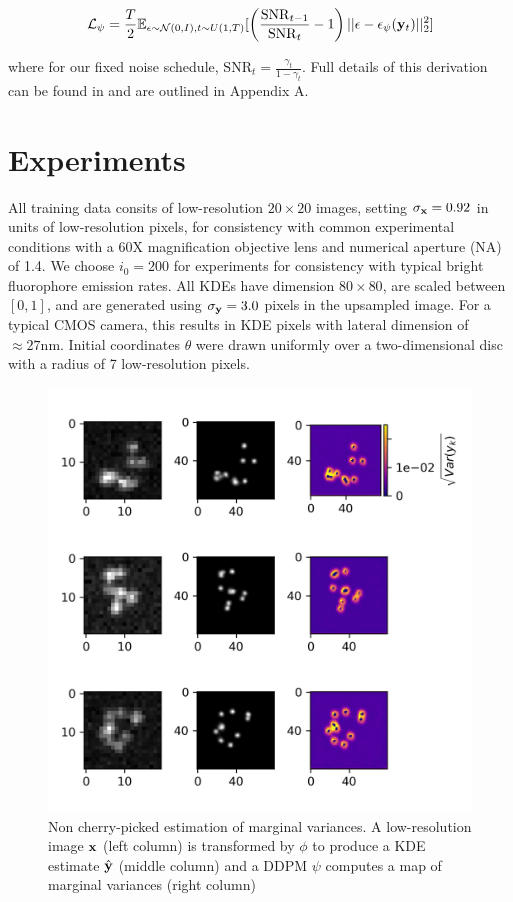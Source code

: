 \documentclass{article}
\begin{document}
\begin{equation}
\mathcal{L}_{\psi} = \frac{T}{2}\mathbb{E}_{\epsilon\sim \mathcal{N}(0,I),t\sim U(1,T)}[\left(\frac{\mathrm{SNR}_{t-1}}{\mathrm{SNR}_{t}}-1\right)\lvert\lvert \bold{\epsilon}-\bold{\epsilon}_{\psi}(\bold{y}_{t})\lvert\lvert_{2}^{2}]
\end{equation}

where for our fixed noise schedule, $\mathrm{SNR}_t = \frac{\gamma_{t}}{1-\gamma_{t}}$. Full details of this derivation can be found in \citep{Kingma2021,Ribeiro2024} and are outlined in Appendix A. 


\section{Experiments}

All training data consits of low-resolution $20\times 20$ images, setting $\sigma_{\bold{x}}=0.92$ in units of low-resolution pixels, for consistency with common experimental conditions with a 60X magnification objective lens and numerical aperture (NA) of 1.4. We choose $i_{0}=200$ for experiments for consistency with typical bright fluorophore emission rates. All KDEs have dimension $80\times 80$, are scaled between $[0,1]$, and are generated using $\sigma_{\bold{y}}=3.0$ pixels in the upsampled image. For a typical CMOS camera, this results in KDE pixels with lateral dimension of $\approx 27\mathrm{nm}$. Initial coordinates $\theta$ were drawn uniformly over a two-dimensional disc with a radius of 7 low-resolution pixels.

\begin{figure}
\centering
\includegraphics[scale=1.1]{media/Bayes.png}
\caption{Non cherry-picked estimation of marginal variances. A low-resolution image $\bold{x}$ (left column) is transformed by $\phi$ to produce a KDE estimate $\hat{\bold{y}}$ (middle column) and a DDPM $\psi$ computes a map of marginal variances (right column)}
\end{figure}
\end{document}
